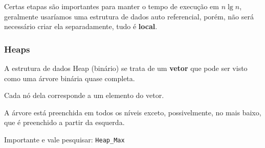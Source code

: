 \documentclass{article}
\begin{document}
Certas etapas são importantes para manter o tempo de execução em $n \lg n$, geralmente usaríamos uma estrutura de dados auto referencial, porém, não será necessário criar ela separadamente, tudo é \textbf{local}.

\subsubsection{Heaps}

A estrutura de dados Heap (binário) se trata de um \textbf{vetor} que pode ser visto como uma árvore binária quase completa.

Cada nó dela corresponde a um elemento do vetor.

A árvore está preenchida em todos os níveis exceto, possivelmente, no mais baixo, que é preenchido a partir da esquerda.

Importante e vale pesquisar: \texttt{Heap\_Max}
\end{document}
